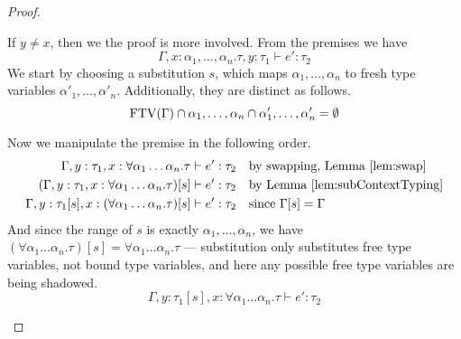 \begin{proof}
\begin{description}
    If $y \ne x$, then we the proof is more involved. From the premises
    we have
    \[\Gamma , x : \alpha_1,\ldots,\alpha_n . \tau , y : \tau_1 \vdash e' : \tau_2\]
    We start by choosing a substitution $s$, which maps $\alpha_1 , \ldots, \alpha_n$
    to fresh type variables $\alpha'_1, \ldots,\alpha'_n$. Additionally, they are
    distinct as follows.
    \[\operatorname{FTV}(\Gamma) \cap \alpha_1,\ldots,\alpha_n \cap \alpha'_1,\ldots,\alpha'_n = \emptyset\]

    Now we manipulate the premise in the following order.
    \begin{align*}
      \Gamma , y : \tau_1 , x : \forall\alpha_1\ldots\alpha_n . \tau &\vdash e' : \tau_2 && \text{by swapping,
                                                   Lemma~\ref{lem:swap}}
      \\
      (\Gamma , y : \tau_1 , x : \forall\alpha_1\ldots\alpha_n . \tau)[s] &\vdash e' : \tau_2 && \text{by
                                                     Lemma~\ref{lem:subContextTyping}}
      \\
      \Gamma , y : \tau_1[s] , x : (\forall\alpha_1\ldots\alpha_n . \tau)[s] &\vdash e' : \tau_2 &&
                                                            \text{since
                                                            } \Gamma[s] = \Gamma
    \end{align*}
    And since the range of $s$ is exactly $\alpha_1,\ldots,\alpha_n$, we have
    $(\forall \alpha_1\ldots\alpha_n . \tau)[s] = \forall \alpha_1\ldots\alpha_n . \tau$ --- substitution only
    substitutes free type variables, not bound type variables, and
    here any possible free type variables are being shadowed.
    \begin{equation}
      \Gamma , y : \tau_1[s] , x : \forall \alpha_1\ldots\alpha_n . \tau \vdash e' : \tau_2
      \label{eq:substAbs2}
    \end{equation}


\end{description}
\end{proof}
